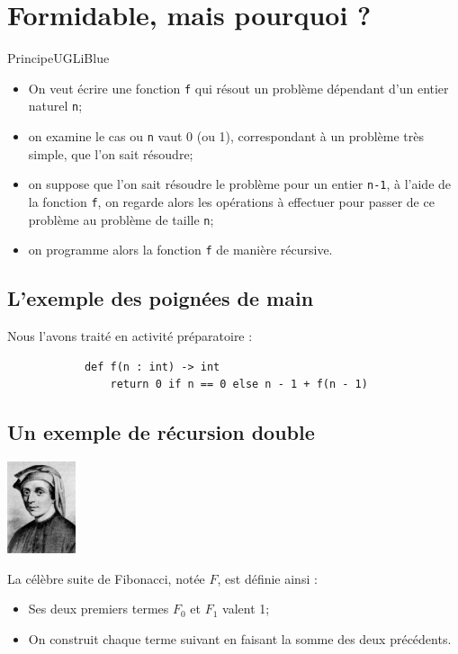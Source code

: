\documentclass[10pt,firamath,cours]{nsi}
\begin{document}
\section{Formidable, mais pourquoi ?}
%

\begin{encadrecolore}{Principe}{UGLiBlue}
    \begin{itemize}
        \item   On veut écrire une fonction \texttt{f} qui résout un problème dépendant d'un entier naturel \texttt{n};
        \item   on examine le cas ou \texttt{n} vaut 0 (ou 1), correspondant à un problème très simple, que l'on sait résoudre;
        \item   on suppose que l'on sait résoudre le problème pour un entier \texttt{n-1}, à l'aide de la fonction \texttt{f}, on regarde alors les opérations à effectuer pour passer de ce problème au problème de taille \texttt{n};
        \item   on programme alors la fonction \texttt{f} de manière récursive.
    \end{itemize}
\end{encadrecolore}


\subsection{L'exemple des poignées de main}

Nous l'avons traité en activité préparatoire :
\begin{pyc}
    \begin{verbatim}
            def f(n : int) -> int
                return 0 if n == 0 else n - 1 + f(n - 1)
        \end{verbatim}
\end{pyc}



\subsection{Un exemple de récursion double}

\begin{center}
    \includegraphics[width=2cm]{img/fibonacci}
\end{center}
La célèbre suite de Fibonacci, notée $F$, est définie ainsi :
\begin{itemize}
    \item   Ses deux premiers termes $F_0$ et $F_1$ valent 1;
    \item   On construit chaque terme suivant en faisant la somme des deux précédents.
\end{itemize}
\end{document}
